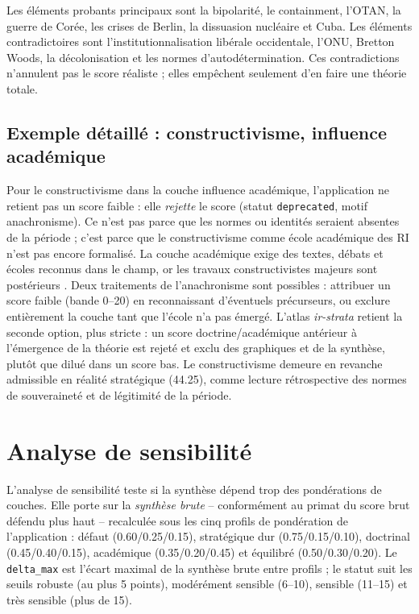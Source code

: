 \documentclass[11pt,a4paper]{article}
\begin{document}
Les éléments probants principaux sont la bipolarité, le containment, l'OTAN, la guerre de Corée, les crises de Berlin, la dissuasion nucléaire et Cuba. Les éléments contradictoires sont l'institutionnalisation libérale occidentale, l'ONU, Bretton Woods, la décolonisation et les normes d'autodétermination. Ces contradictions n'annulent pas le score réaliste ; elles empêchent seulement d'en faire une théorie totale.

\subsection{Exemple détaillé : constructivisme, influence académique}

Pour le constructivisme dans la couche influence académique, l'application ne retient pas un score faible : elle \emph{rejette} le score (statut \texttt{deprecated}, motif anachronisme). Ce n'est pas parce que les normes ou identités seraient absentes de la période ; c'est parce que le constructivisme comme école académique des RI n'est pas encore formalisé. La couche académique exige des textes, débats et écoles reconnus dans le champ, or les travaux constructivistes majeurs sont postérieurs \citep{onuf1989world,kratochwil1989rules,wendt1999social}. Deux traitements de l'anachronisme sont possibles : attribuer un score faible (bande 0--20) en reconnaissant d'éventuels précurseurs, ou exclure entièrement la couche tant que l'école n'a pas émergé. L'atlas \emph{ir-strata} retient la seconde option, plus stricte : un score doctrine/académique antérieur à l'émergence de la théorie est rejeté et exclu des graphiques et de la synthèse, plutôt que dilué dans un score bas. Le constructivisme demeure en revanche admissible en réalité stratégique (44.25), comme lecture rétrospective des normes de souveraineté et de légitimité de la période.

\section{Analyse de sensibilité}

L'analyse de sensibilité teste si la synthèse dépend trop des pondérations de couches. Elle porte sur la \emph{synthèse brute} -- conformément au primat du score brut défendu plus haut -- recalculée sous les cinq profils de pondération de l'application : défaut (0.60/0.25/0.15), stratégique dur (0.75/0.15/0.10), doctrinal (0.45/0.40/0.15), académique (0.35/0.20/0.45) et équilibré (0.50/0.30/0.20). Le \texttt{delta\_max} est l'écart maximal de la synthèse brute entre profils ; le statut suit les seuils robuste (au plus 5 points), modérément sensible (6--10), sensible (11--15) et très sensible (plus de 15).
\end{document}
